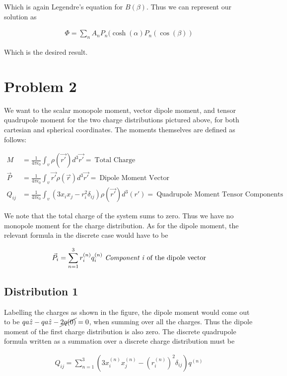 \documentclass[paper=a4, fontsize=11pt]{scrartcl} %
\newcommand{\kay}{\frac{1}{4 \pi \epsilon_0}}
\numberwithin{equation}{section} %
\numberwithin{figure}{section} %
\numberwithin{table}{section} %
\begin{document}
Which is again Legendre's equation for $B(\beta)$. Thus we can represent our solution as 

\begin{align}
\Phi = \sum_n A_n P_n(\cosh(\alpha)P_n(\cos(\beta))
\end{align}

Which is the desired result.

\section{Problem 2}

We want to the scalar monopole moment, vector dipole moment, and tensor quadrupole moment for the two charge distributions pictured above, for both cartesian and spherical coordinates. The moments themselves are defined as follows:

\begin{align}
M &= \kay \int_v \rho(\vec{r'})d^3\vec{r'} = \ \text{Total Charge}  \\
\vec{P} &= \kay \int_v \vec{r'}\rho(\vec{r})d^3\vec{r'} = \ \text{Dipole Moment Vector} \\
Q_{ij} &= \kay \int_v (3x_ix_j - r_i^2\delta_{ij})\rho(\vec{r'})d^3(r') = \ \text{Quadrupole Moment Tensor Components}
\end{align}

We note that the total charge of the system sums to zero. Thus we have no monopole moment for the charge distribution. As for the dipole moment, the relevant formula in the discrete case would have to be 

\begin{align}
\vec{P}_i &= \sum_{n=1}^3 r_i^{(n)}q_i^{(n)} \ \text{\textit{Component i} of the dipole vector} \\
\end{align}

\subsection{Distribution 1}

Labelling the charges as shown in the figure, the dipole moment  would come out to be $qa\hat{z} - qa\hat{z} -\cancel{2q(0)} = 0$, when summing over all the charges. Thus the dipole moment of the first charge distribution is also zero. The discrete quadrupole formula written as a summation over a discrete charge distribution must be 

\begin{align}
Q_{ij} = \sum_{n=1}^3 (3x_i^{(n)}x_j^{(n)} - (r_i^{(n)})^2\delta_{ij})q^{(n)}
\end{align}
\end{document}
